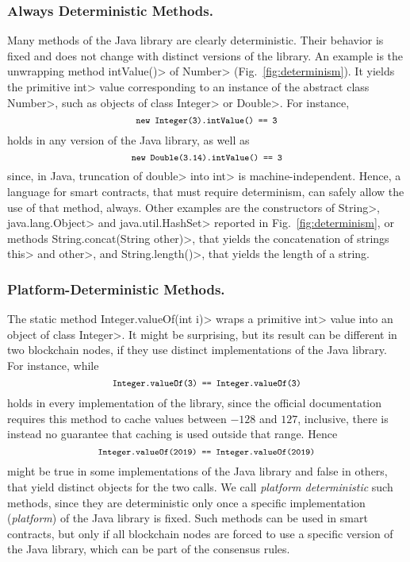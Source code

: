 \subsubsection*{Always Deterministic Methods.}
Many methods of the Java library are clearly deterministic. Their behavior is fixed
and does not change with distinct versions of the library. An example is the unwrapping
method \<intValue()> of \<Number> (Fig.~\ref{fig:determinism}). It yields
the primitive \<int> value corresponding to an instance of the abstract class \<Number>, such
as objects of class \<Integer> or \<Double>. For instance,
\[
\<new Integer(3).intValue() == 3>
\]
holds in any version of the Java library, as well as
\[
\<new Double(3.14).intValue() == 3>
\]
since, in Java, truncation of \<double> into \<int> is machine-independent.
Hence, a language for smart contracts, that must require determinism,
can safely allow the use of that method, always. Other examples
are the constructors of \<String>, \<java.lang.Object> and \<java.util.HashSet>
reported in Fig.~\ref{fig:determinism}, or methods
\<String.concat(String other)>, that yields the concatenation of strings \<this> and \<other>,
and \<String.length()>, that yields the length of a string.

\subsubsection*{Platform-Deterministic Methods.}
The static method \<Integer.valueOf(int i)> wraps
a primitive \<int> value into an object of class \<Integer>. It might be surprising,
but its result can be different in two blockchain nodes, if they
use distinct implementations of the Java library. For instance, while
\[
\<Integer.valueOf(3) == Integer.valueOf(3)>
\]
holds in every implementation of the library, since the official documentation requires this method
to cache values between $-128$ and $127$, inclusive, there is instead no guarantee that caching is
used outside that range. Hence
\[
\<Integer.valueOf(2019) == Integer.valueOf(2019)>
\]
might be true in some implementations of the Java library
and false in others, that yield distinct objects for the two calls.
We call \emph{platform deterministic} such methods, since they are deterministic only once a specific
implementation (\emph{platform}) of the Java library is fixed. Such methods can be used in smart contracts,
but only if all blockchain nodes are forced to
use a specific version of the Java library, which can be part of the consensus rules.

